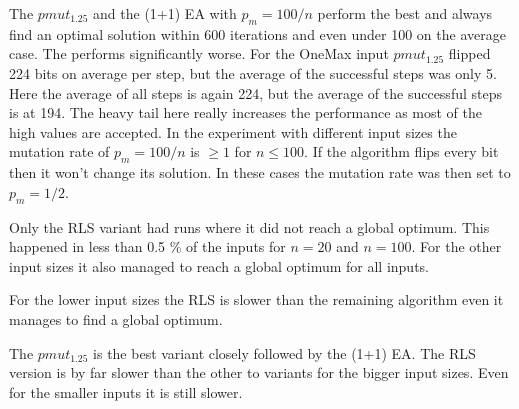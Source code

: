 

The $pmut_{1.25}$ and the (1+1) EA with $p_m=100/n$ perform the best and always find an optimal solution within 600 iterations and even under 100 on the average case.
The \RLSN[4] performs significantly worse.
For the OneMax input $pmut_{1.25}$ flipped 224 bits on average per step, but the average of the successful steps was only 5.
Here the average of all steps is again 224, but the average of the successful steps is at 194.
The heavy tail here really increases the performance as most of the high values are accepted.
In the experiment with different input sizes the mutation rate of $p_m=100/n$ is $\ge1$ for $n\le100$.
If the algorithm flips every bit then it won't change its solution.
In these cases the mutation rate was then set to $p_m=1/2$.



Only the RLS variant had runs where it did not reach a global optimum.
This happened in less than 0.5 \% of the inputs for $n=20$ and $n=100$.
For the other input sizes it also managed to reach a global optimum for all inputs.



For the lower input sizes the RLS is slower than the remaining algorithm even it manages to find a global optimum.



The $pmut_{1.25}$ is the best variant closely followed by the (1+1) EA.
The RLS version is by far slower than the other to variants for the bigger input sizes.
Even for the smaller inputs it is still slower.
